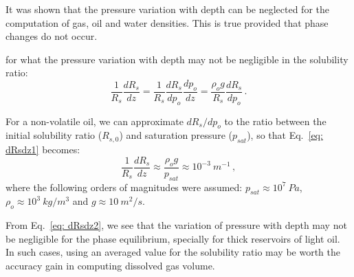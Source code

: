 \documentclass[authoryear,preprint,review,11pt]{elsarticle}
\begin{document}
It was shown that the pressure variation with depth can be neglected for the computation of gas, oil and water densities. This is true provided that phase changes do not occur. 

 for what the pressure variation with depth may not be negligible in the solubility ratio: 
\begin{equation}\label{eq: dRsdz1}
\frac{1}{R_s}\frac{d R_s}{dz} = \frac{1}{R_s}\frac{d R_s}{dp_o} \frac{dp_o}{dz} = \frac{\rho_o g}{R_s}\frac{dR_s}{dp_o} \, .
\end{equation}

For a non-volatile oil, we can approximate $dR_s / dp_o$ to the ratio between the initial solubility ratio ($R_{s,0}$) and saturation pressure ($p_{sat}$), so that Eq.~\eqref{eq: dRsdz1} becomes:
\begin{equation}\label{eq: dRsdz2}
\frac{1}{R_s}\frac{d R_s}{dz} \approx \frac{\rho_o g }{p_{sat}} \approx 10^{-3}\ m^{-1} \, ,
\end{equation}
where the following orders of magnitudes were assumed: $p_{sat} \approx 10^{7}\ Pa$, $\rho_o \approx 10^{3}\ kg/m^3$ and $g \approx 10\ m^2/s$. 

From Eq.~\eqref{eq: dRsdz2}, we see that the variation of pressure with depth may not be negligible for the phase equilibrium,  specially for thick reservoirs of light oil. In such cases, using an averaged value for the solubility ratio may be worth the accuracy gain in computing dissolved gas volume.




\end{document}
